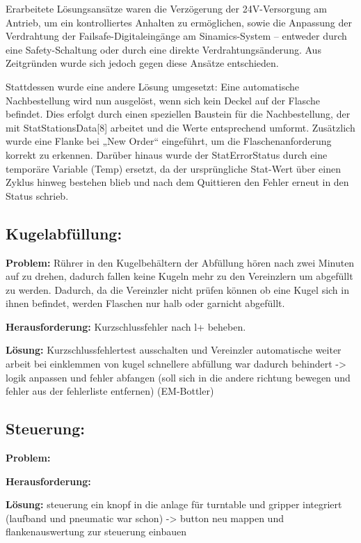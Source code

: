 Erarbeitete Lösungsansätze waren die Verzögerung der 24V-Versorgung am Antrieb, um ein kontrolliertes Anhalten zu ermöglichen, sowie die Anpassung der Verdrahtung der Failsafe-Digitaleingänge am Sinamics-System – entweder durch eine Safety-Schaltung oder durch eine direkte Verdrahtungsänderung. Aus Zeitgründen wurde sich jedoch gegen diese Ansätze entschieden.

Stattdessen wurde eine andere Lösung umgesetzt: Eine automatische Nachbestellung wird nun ausgelöst, wenn sich kein Deckel auf der Flasche befindet. Dies erfolgt durch einen speziellen Baustein für die Nachbestellung, der mit StatStationsData[8] arbeitet und die Werte entsprechend umformt. Zusätzlich wurde eine Flanke bei „New Order“ eingeführt, um die Flaschenanforderung korrekt zu erkennen. Darüber hinaus wurde der StatErrorStatus durch eine temporäre Variable (Temp) ersetzt, da der ursprüngliche Stat-Wert über einen Zyklus hinweg bestehen blieb und nach dem Quittieren den Fehler erneut in den Status schrieb.
\subsection{Kugelabfüllung:} 
\textbf{Problem:}
Rührer in den Kugelbehältern der Abfüllung hören nach zwei Minuten auf zu drehen, dadurch fallen keine Kugeln mehr zu den Vereinzlern um abgefüllt zu werden. Dadurch, da die Vereinzler nicht prüfen können ob eine Kugel sich in ihnen befindet, werden Flaschen nur halb oder garnicht abgefüllt.

\textbf{Herausforderung:}
Kurzschlussfehler nach l+ beheben.

\textbf{Lösung:}
Kurzschlussfehlertest ausschalten und 
Vereinzler automatische weiter arbeit bei einklemmen von kugel schnellere abfüllung war dadurch behindert -> logik anpassen und fehler abfangen (soll sich in die andere richtung bewegen und fehler aus der fehlerliste entfernen) (EM-Bottler)
\subsection{Steuerung:}
\textbf{Problem:}

\textbf{Herausforderung:}

\textbf{Lösung:}
steuerung ein knopf in die anlage für turntable und gripper integriert (laufband und pneumatic war schon) -> button neu mappen und flankenauswertung zur steuerung einbauen
